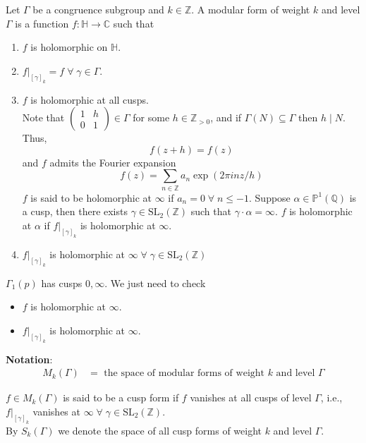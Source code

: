 \documentclass[oneside, 12pt]{scrbook}
\newcommand{\CC}{\mathbb C}
\newcommand{\QQ}{\mathbb Q}
\newcommand{\ZZ}{\mathbb Z}
\newcommand{\PP}{\mathbb{P}}
\newcommand{\SL}{\mathrm{SL}}
\theoremstyle{theorem}
\begin{document}
\begin{definition}
Let $\Gamma$ be a congruence subgroup and $k \in \ZZ$. A modular form of weight $k$ and level $\Gamma$ is a function $f: \mathbb{H} \rightarrow \CC$ such that 
\begin{enumerate}
\item $f$ is holomorphic on $\mathbb{H}$.
\item $f|_{[\gamma]_{k}} = f \; \forall \; \gamma \in \Gamma$.
\item $f$ is holomorphic at all cusps. \\
Note that $\begin{pmatrix}
1 & h \\ 0 & 1
\end{pmatrix} \in \Gamma$ for some $h \in \ZZ_{>0}$, and if $\Gamma(N) \subseteq \Gamma$ then $h \mid N$. Thus, $$f(z+h) = f(z)$$ and $f $ admits the Fourier expansion $$f(z) = \sum_{n \in \ZZ} a_{n} \exp(2 \pi i n z/h)$$
$f$ is said to be holomorphic at $\infty$ if $a_{n} =0 \; \forall \; n \le -1$. Suppose $\alpha \in \PP^1(\QQ)$ is a cusp, then there exists $\gamma \in \SL_{2}(\ZZ)$ such that $\gamma \cdot \alpha = \infty$. $f$ is holomorphic at $\alpha$ if $f|_{[\gamma]_{k}}$ is holomorphic at $\infty$.
\item $f|_{[\gamma]_{k}}$ is holomorphic at $\infty \; \forall \; \gamma \in \SL_{2}(\ZZ)$ 
\end{enumerate}
\end{definition}

\begin{example}
$\Gamma_{1}(p)$ has cusps $0, \infty$. We just need to check 
\begin{itemize}
\item $f$ is holomorphic at $\infty$.
\item $f|_{[\gamma]_{k}}$ is holomorphic at $\infty$.
\end{itemize}
\end{example}

\textbf{Notation}: 
\begin{align*}
M_{k}(\Gamma) &= \text{ the space of modular forms of weight $k$ and level $\Gamma$} 
\end{align*}

\begin{definition}
$f \in M_{k}(\Gamma)$ is said to be a cusp form if $f$ vanishes at all cusps of level $\Gamma$, i.e., $f|_{[\gamma]_{k}}$ vanishes at $\infty \; \forall \; \gamma \in \SL_{2}(\ZZ)$. \\

By $S_{k}(\Gamma)$ we denote the space of all cusp forms of weight $k$ and level $\Gamma$.
\end{definition}
\end{document}
